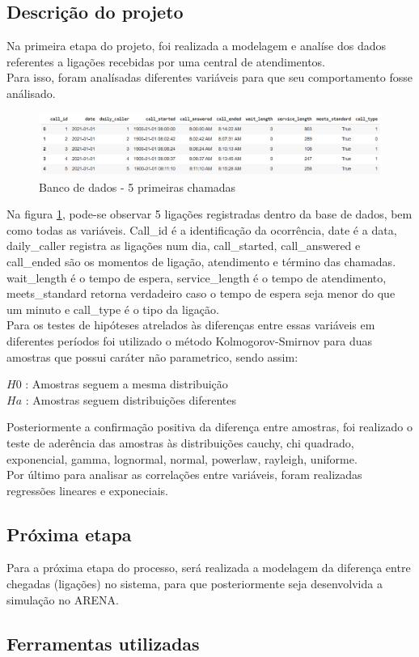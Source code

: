 \subsection{Descrição do projeto}
Na primeira etapa do projeto, foi realizada a modelagem e analíse dos dados referentes a ligações recebidas por uma central de atendimentos.\\
Para isso, foram analísadas diferentes variáveis para que seu comportamento fosse análisado.\\
\begin{figure}[ht]
    \includegraphics[scale= 0.6]{introducao/imgintro.png}
    \caption{Banco de dados - 5 primeiras chamadas}
    \label{fig: bd_img}
\end{figure}
Na figura \ref*{fig: bd_img}, pode-se observar 5 ligações registradas dentro da base de dados, bem como todas as variáveis. Call\_id é a identificação da ocorrência, date é a data, daily\_caller registra as ligações num dia, call\_started, call\_answered e call\_ended são os momentos de ligação, atendimento e término das chamadas. 
wait\_length é o tempo de espera,  service\_length é o tempo de atendimento, meets\_standard retorna verdadeiro caso o tempo de espera seja menor do que um minuto e call\_type é o tipo da ligação.\\
Para os testes de hipóteses atrelados às diferenças entre essas variáveis em diferentes períodos foi utilizado o método Kolmogorov-Smirnov para duas amostras que possui caráter não parametrico, sendo assim:\\
\begin{center}
$H{0}$ : Amostras seguem a mesma distribuição\\
$H{a}$ : Amostras seguem distribuições diferentes
\end{center}
Posteriormente a confirmação positiva da diferença entre amostras, foi realizado o teste de aderência das amostras às distribuições cauchy, chi quadrado, exponencial, gamma, lognormal, normal, powerlaw, rayleigh, uniforme.\\
Por último para analisar as correlações entre variáveis, foram realizadas regressões lineares e exponeciais.\\

\subsection{Próxima etapa}
Para a próxima etapa do processo, será realizada a modelagem da diferença entre chegadas (ligações) no sistema, para que posteriormente seja desenvolvida a simulação no ARENA.

\subsection{Ferramentas utilizadas}
